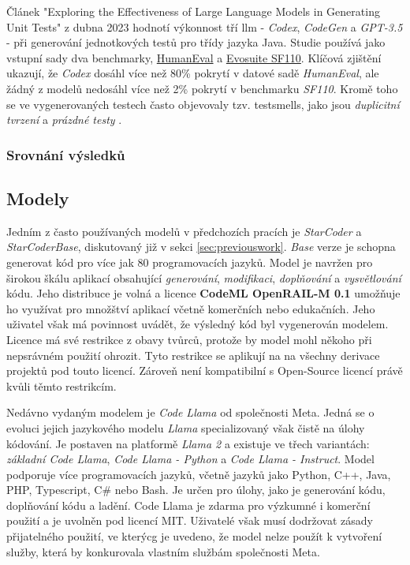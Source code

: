 \documentclass[12pt]{article}
\begin{document}
        Článek "Exploring the Effectiveness of Large Language Models in Generating Unit Tests" \cite{siddiq2023exploring} z dubna 2023 hodnotí výkonnost tří \gls{llm} - \textit{Codex}, \textit{CodeGen} a \textit{GPT-3.5} - při generování jednotkových testů pro třídy jazyka Java. Studie používá jako vstupní sady dva benchmarky, \href{https://paperswithcode.com/dataset/humaneval-x}{HumanEval} a \href{https://paperswithcode.com/dataset/evosuite-sf110-benchmark}{Evosuite SF110}. Klíčová zjištění ukazují, že \textit{Codex} dosáhl více než 80\% pokrytí v datové sadě \textit{HumanEval}, ale žádný z modelů nedosáhl více než 2\% pokrytí v benchmarku \textit{SF110}. Kromě toho se ve vygenerovaných testech často objevovaly tzv. \gls{testsmells}, jako jsou \textit{duplicitní tvrzení} a \textit{prázdné testy} \cite{testsmells}.

            \subsubsection{Srovnání výsledků}

        \subsection{Modely}

            Jedním z často používaných modelů v předchozích pracích je \textit{StarCoder} a \textit{StarCoderBase}, diskutovaný již v sekci \ref{sec:previouswork}. \textit{Base} verze je schopna generovat kód pro více jak 80 programovacích jazyků. Model je navržen pro širokou škálu aplikací obsahující \textit{generování}, \textit{modifikaci}, \textit{doplňování} a \textit{vysvětlování} kódu. Jeho distribuce je volná a licence \textbf{CodeML OpenRAIL-M 0.1} \cite{BigCode2023} umožňuje ho využívat pro množštví aplikací včetně komerčních nebo edukačních. Jeho uživatel však má povinnost uvádět, že výsledný kód byl vygenerován modelem. Licence má své restrikce z obavy tvůrců, protože by model mohl někoho při nepsrávném použití ohrozit. Tyto restrikce se aplikují na na všechny derivace projektů pod touto licencí. Zároveň není kompatibilní s Open-Source licencí právě kvůli těmto restrikcím.

            Nedávno vydaným modelem je \textit{Code Llama} od společnosti Meta. Jedná se o evoluci jejich jazykového modelu \textit{Llama} specializovaný však čistě na úlohy kódování. Je postaven na platformě \textit{Llama 2} a existuje ve třech variantách: \textit{základní Code Llama}, \textit{Code Llama - Python} a \textit{Code Llama - Instruct}. Model podporuje více programovacích jazyků, včetně jazyků jako Python, C++, Java, PHP, Typescript, C# nebo Bash. Je určen pro úlohy, jako je generování kódu, doplňování kódu a ladění. Code Llama je zdarma pro výzkumné i komerční použití a je uvolněn pod licencí MIT. Uživatelé však musí dodržovat  zásady přijatelného použití, ve kterýcg je uvedeno, že model nelze použít k vytvoření služby, která by konkurovala vlastním službám společnosti Meta. 
\end{document}
